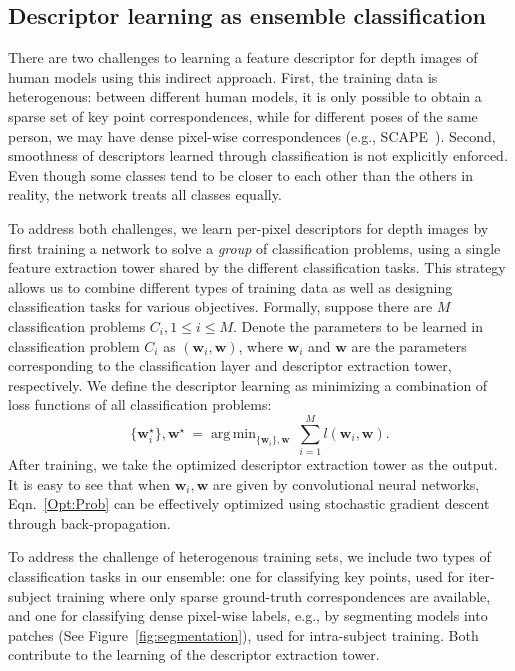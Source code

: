 \documentclass[10pt,twocolumn,letterpaper]{article}
\DeclareMathOperator*{\argmin}{arg\,min}
\begin{document}
\subsection{Descriptor learning as ensemble classification}
There are two challenges to learning a feature descriptor for depth images of human models using this indirect approach. First, the training data is heterogenous: between different human models, it is only possible to obtain a sparse set of key point correspondences, while for different poses of the same person, we may have dense pixel-wise correspondences (e.g., SCAPE~\cite{Anguelov:2005}). Second, smoothness of descriptors learned through classification is not explicitly enforced. Even though some classes tend to be closer to each other than the others in reality, the network treats all classes equally.

To address both challenges, we learn per-pixel descriptors for depth images by first training a network to solve a \emph{group} of classification problems, using a single feature extraction tower shared by the different classification tasks. This strategy allows us to combine different types of training data as well as designing classification tasks for various objectives. Formally, suppose there are $M$ classification problems $C_i, 1\leq i \leq M$. Denote the parameters to be learned in classification problem $C_i$ as $(\mathbf{w}_i, \mathbf{w})$, where $\mathbf{w}_i$ and $\mathbf{w}$ are the parameters corresponding to the classification layer and descriptor extraction tower, respectively. We define the descriptor learning as minimizing a combination of loss functions of all classification problems:
\begin{equation}
\{\mathbf{w}_i^{\star}\}, \mathbf{w}^{\star} \ = \argmin_{\{\mathbf{w}_i\}, \mathbf{w}} \ \sum\limits_{i=1}^{M}l(\mathbf{w}_i, \mathbf{w}).
\label{Opt:Prob}
\end{equation}
After training, we take the optimized descriptor extraction tower as the output. It is easy to see that when $\mathbf{w}_i, \mathbf{w}$ are given by convolutional neural networks, Eqn.~\ref{Opt:Prob} can be effectively optimized using stochastic gradient descent through back-propagation.

To address the challenge of heterogenous training sets, we include two types of classification tasks in our ensemble: one for classifying key points, used for iter-subject training where only sparse ground-truth correspondences are available, and one for classifying dense pixel-wise labels, e.g., by segmenting models into patches (See Figure~\ref{fig:segmentation}), used for intra-subject training. Both contribute to the learning of the descriptor extraction tower.
\end{document}
